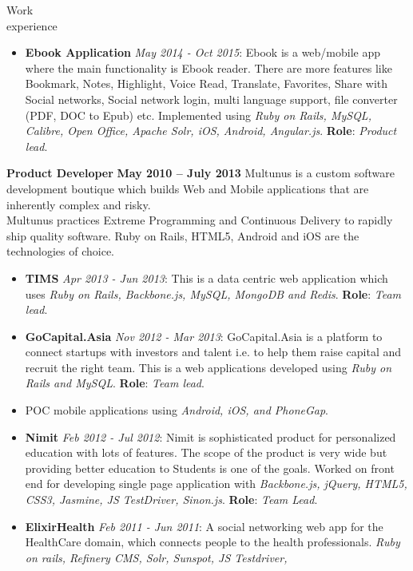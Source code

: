 \documentclass{resume}
\begin{document}
\begin{category}{Work \\experience}
\begin{itemize}
  \item \textbf{Ebook Application} {\em May 2014 - Oct 2015}: Ebook is
    a web/mobile app where the main functionality is Ebook
    reader. There are more features like Bookmark, Notes, Highlight,
    Voice Read, Translate, Favorites, Share with Social networks,
    Social network login, multi language support, file converter (PDF,
    DOC to Epub) etc. Implemented using {\em Ruby on Rails, MySQL,
      Calibre, Open Office, Apache Solr, iOS, Android,
      Angular.js}. \textbf{Role}: {\em Product lead}.
  \end{itemize}
  \citemnobullet \textbf{Product Developer} \hfill \textbf{May 2010 -- July 2013}
  \citemnobullet Multunus is a custom software development boutique
  which builds Web and Mobile applications that are inherently
  complex and risky.\\Multunus practices Extreme Programming and Continuous
  Delivery to rapidly ship quality software. Ruby on Rails, HTML5, Android and iOS are the technologies of choice.
  \begin{itemize}
  \item \textbf{TIMS} {\em Apr 2013 - Jun 2013}: This is a data centric web application which uses {\em Ruby on Rails, Backbone.js, MySQL, MongoDB and Redis}. \textbf{Role}: {\em Team lead}.
  \item \textbf{GoCapital.Asia} {\em Nov 2012 - Mar 2013}: GoCapital.Asia is a
    platform to connect startups with investors and talent i.e. to
    help them raise capital and recruit the right team. This is a web
    applications developed using {\em Ruby on Rails and MySQL}. \textbf{Role}:
    {\em Team lead}.
  \item POC mobile applications using {\em Android, iOS, and PhoneGap}.
  \item \textbf{Nimit} {\em Feb 2012 - Jul 2012}: Nimit is sophisticated
    product for personalized education with lots of features. The
    scope of the product is very wide but providing better education
    to Students is one of the goals. Worked on front end for
    developing single page application with {\em Backbone.js, jQuery,
      HTML5, CSS3, Jasmine, JS TestDriver, Sinon.js}. \textbf{Role}: {\em Team Lead}.
  \item \textbf{ElixirHealth} {\em Feb 2011 - Jun 2011}: A social networking web app for the HealthCare
    domain, which connects people to the health professionals. {\em
      Ruby on rails, Refinery CMS, Solr, Sunspot, JS Testdriver,
}
\end{itemize}
\end{category}
\end{document}
